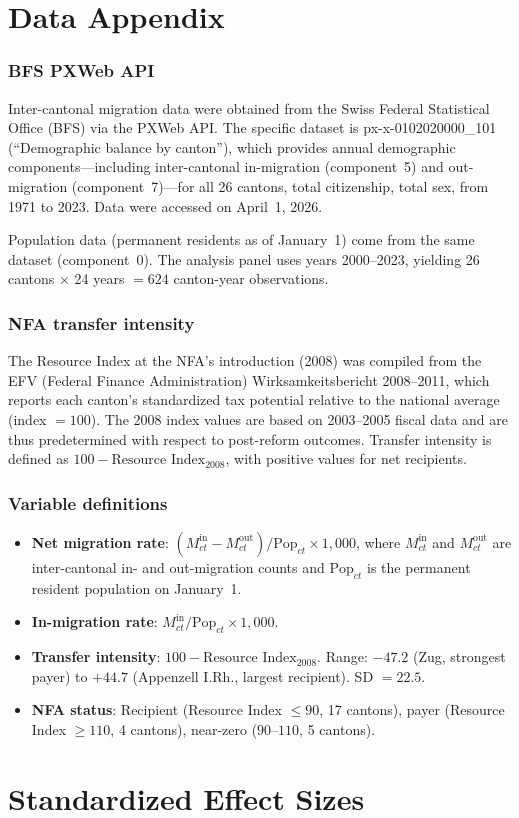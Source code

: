 \documentclass[12pt]{article}
\begin{document}
\newpage
\appendix

\section{Data Appendix}

\subsubsection*{BFS PXWeb API} Inter-cantonal migration data were obtained from the Swiss Federal Statistical Office (BFS) via the PXWeb API. The specific dataset is px-x-0102020000\_101 (``Demographic balance by canton''), which provides annual demographic components---including inter-cantonal in-migration (component~5) and out-migration (component~7)---for all 26 cantons, total citizenship, total sex, from 1971 to 2023. Data were accessed on April~1, 2026.

Population data (permanent residents as of January~1) come from the same dataset (component~0). The analysis panel uses years 2000--2023, yielding 26 cantons $\times$ 24 years $= 624$ canton-year observations.

\subsubsection*{NFA transfer intensity} The Resource Index at the NFA's introduction (2008) was compiled from the EFV (Federal Finance Administration) Wirksamkeitsbericht 2008--2011, which reports each canton's standardized tax potential relative to the national average (index $= 100$). The 2008 index values are based on 2003--2005 fiscal data and are thus predetermined with respect to post-reform outcomes. Transfer intensity is defined as $100 - \text{Resource Index}_{2008}$, with positive values for net recipients.

\subsubsection*{Variable definitions}

\begin{itemize}
\item \textbf{Net migration rate}: $(M^{\text{in}}_{ct} - M^{\text{out}}_{ct}) / \text{Pop}_{ct} \times 1{,}000$, where $M^{\text{in}}_{ct}$ and $M^{\text{out}}_{ct}$ are inter-cantonal in- and out-migration counts and $\text{Pop}_{ct}$ is the permanent resident population on January~1.
\item \textbf{In-migration rate}: $M^{\text{in}}_{ct} / \text{Pop}_{ct} \times 1{,}000$.
\item \textbf{Transfer intensity}: $100 - \text{Resource Index}_{2008}$. Range: $-47.2$ (Zug, strongest payer) to $+44.7$ (Appenzell I.Rh., largest recipient). SD $= 22.5$.
\item \textbf{NFA status}: Recipient (Resource Index $\leq 90$, 17 cantons), payer (Resource Index $\geq 110$, 4 cantons), near-zero ($90$--$110$, 5 cantons).
\end{itemize}

\section{Standardized Effect Sizes}
\label{sec:sde}


\end{document}
